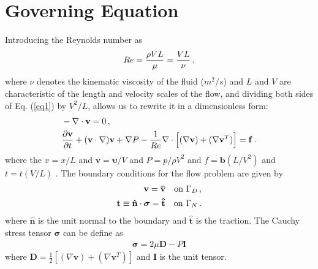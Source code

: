 \documentclass[]{article}
\begin{document}
\section{Governing Equation} \label{sec: GE} 
Introducing the Reynolds number as
\begin{equation}\label{eq2}
	\begin{aligned}
		Re = \frac{\rho VL}{\mu} = \frac{VL}{\nu}\thinspace.
	\end{aligned}
\end{equation}
where $\nu$ denotes the kinematic viscosity of the fluid ($m^2/s$) and $L$ and $V$ are characteristic of the length and velocity scales of the flow, and dividing both sides of Eq. (\ref{eq1}) by $V^2/L$, allows us to rewrite it in a dimensionless form:
\begin{equation}\label{eq3}
	\begin{aligned}
		&-\nabla \cdot \mathbf{v} = 0\thinspace,\\
		& \frac{\partial \mathbf{v}}{\partial t } + (\mathbf{v} \cdot \nabla) \mathbf{v}  + \nabla P - \frac{1}{Re} \nabla \cdot \Big[(\nabla \mathbf{v}) + (\nabla \mathbf{v}^T)  \Big]=  \mathbf{f}\thinspace.
	\end{aligned}
\end{equation}
where the $x =x/L$ and $\mathbf{v}= \boldsymbol{\upsilon}/V$ and $P = p/\rho V^2$ and $f=\mathbf{b}(L/V^2)$ and $t=t(V/L)$ . The boundary conditions for the flow problem are
given by
\begin{equation}\label{eq4}
	\begin{aligned}
		\mathbf{v} = \mathbf{\bar{v}} \quad \mathrm{on} \ \Gamma_D\thinspace,\\
		\mathbf{t} \equiv \mathbf{\hat{n}} \cdot \boldsymbol{\sigma} = \mathbf{\hat{t}} \quad \mathrm{on} \ \Gamma_N\thinspace.
	\end{aligned}
\end{equation}
where $\mathbf{\hat{n}}$ is the unit normal to the boundary and $\mathbf{\hat{t}}$ is the traction.  The Cauchy stress tensor $\boldsymbol{\sigma}$ can be define as 
\begin{equation}\label{eq5}
	\begin{aligned}
		\boldsymbol{\sigma} = 2\mu \mathbf{D} - P \mathbf{I}
	\end{aligned}
\end{equation}
where $\mathbf{D} = \frac{1}{2} [(\nabla \mathbf{v}) + (\nabla \mathbf{v}^T)]$ and $\mathbf{I}$ is the unit tensor.
\end{document}
